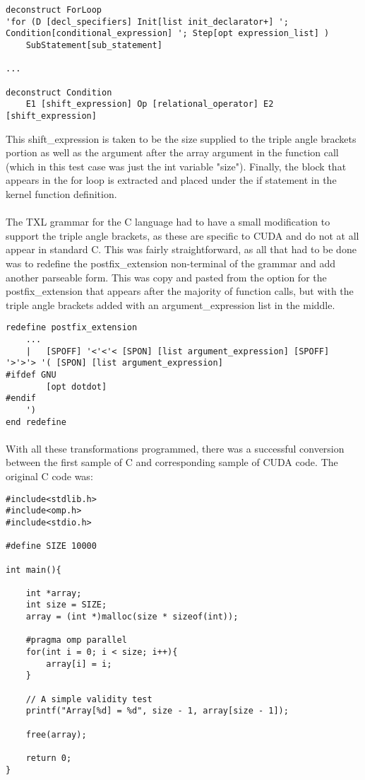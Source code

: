 \documentclass{article}
\begin{document}
\begin{lstlisting}
deconstruct ForLoop
'for (D [decl_specifiers] Init[list init_declarator+] '; Condition[conditional_expression] '; Step[opt expression_list] ) 
	SubStatement[sub_statement]
	
...

deconstruct Condition
    E1 [shift_expression] Op [relational_operator] E2 [shift_expression]
\end{lstlisting}
This shift\_expression is taken to be the size supplied to the triple angle brackets portion as well as the argument after the array argument in the function call (which in this test case was just the int variable "size"). Finally, the block that appears in the for loop is extracted and placed under the if statement in the kernel function definition.

\paragraph{}
The TXL grammar for the C language had to have a small modification to support the triple angle brackets, as these are specific to CUDA and do not at all appear in standard C. This was fairly straightforward, as all that had to be done was to redefine the postfix\_extension non-terminal of the grammar and add another parseable form. This was copy and pasted from the option for the postfix\_extension that appears after the majority of function calls, but with the triple angle brackets added with an argument\_expression list in the middle.

\begin{lstlisting}
redefine postfix_extension
	...
    |   [SPOFF] '<'<'< [SPON] [list argument_expression] [SPOFF] '>'>'> '( [SPON] [list argument_expression] 
#ifdef GNU
	    [opt dotdot]
#endif
	')
end redefine
\end{lstlisting}

\paragraph{}
With all these transformations programmed, there was a successful conversion between the first sample of C and corresponding sample of CUDA code. The original C code was:

\begin{lstlisting}
#include<stdlib.h>
#include<omp.h>
#include<stdio.h>

#define SIZE 10000

int main(){

	int *array;
	int size = SIZE;
	array = (int *)malloc(size * sizeof(int));

	#pragma omp parallel
	for(int i = 0; i < size; i++){
		array[i] = i;
	}

	// A simple validity test
	printf("Array[%d] = %d", size - 1, array[size - 1]);

	free(array);

	return 0;
}

\end{lstlisting}
\end{document}
